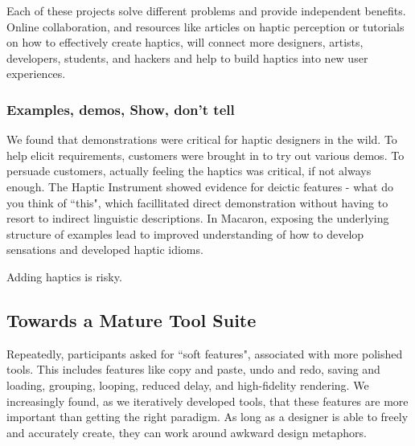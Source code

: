     Each of these projects solve different problems and provide independent benefits.
    Online collaboration, and resources like articles on haptic perception or tutorials on how to effectively create haptics, will connect more designers, artists, developers, students, and hackers and help to build haptics into new user experiences.


\subsubsection{Examples, demos, Show, don't tell}
We found that demonstrations were critical for haptic designers in the wild.
To help elicit requirements, customers were brought in to try out various demos.
To persuade customers, actually feeling the haptics was critical, if not always enough.
The Haptic Instrument showed evidence for deictic features - what do you think of ``this", which facillitated direct demonstration without having to resort to indirect linguistic descriptions.
In Macaron, exposing the underlying structure of examples lead to improved understanding of how to develop sensations and developed haptic idioms.





Adding haptics is risky.




%
%
\subsection{Towards a Mature \haxd Tool Suite}
\label{sec:conclusion:maturetoolsuite}



Repeatedly, participants asked for ``soft features", associated with more polished tools.
This includes features like copy and paste, undo and redo, saving and loading, grouping, looping, reduced delay, and high-fidelity rendering.
We increasingly found, as we iteratively developed \haxd tools, that these features are more important than getting the right paradigm.
As long as a designer is able to freely and accurately create, they can work around awkward design metaphors.

